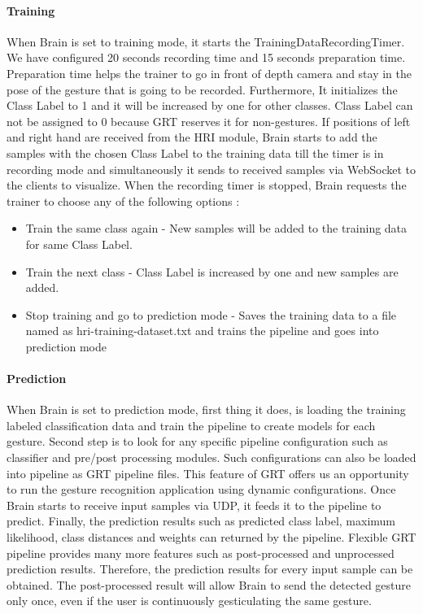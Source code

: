 \paragraph*{Training} When Brain is set to training mode, it starts the TrainingDataRecordingTimer. We have configured 20 seconds recording time and 15 seconds preparation time. Preparation time helps the trainer to go in front of depth camera and stay in the pose of the gesture that is going to be recorded. Furthermore, It initializes the Class Label to 1 and it will be increased by one for other classes. Class Label can not be assigned to 0 because GRT reserves it for non-gestures. If positions of left and right hand are received from the HRI module, Brain starts to add the samples with the chosen Class Label to the training data till the timer is in recording mode and simultaneously it sends to received samples via WebSocket to the clients to visualize. When the recording timer is stopped, Brain requests the trainer to choose any of the following options :

\begin{itemize}
	\item Train the same class again - New samples will be added to the training data for same Class Label.
	\item Train the next class - Class Label is increased by one and new samples are added.
	\item Stop training and go to prediction mode - Saves the training data to a file named as hri-training-dataset.txt and trains the pipeline and goes into prediction mode
\end{itemize}

\paragraph*{Prediction} When Brain is set to prediction mode, first thing it does, is loading the training labeled classification data and train the pipeline to create models for each gesture. Second step is to look for any specific pipeline configuration such as classifier and pre/post processing modules. Such configurations can also be loaded into pipeline as GRT pipeline files. This feature of GRT offers us an opportunity to run the gesture recognition application using dynamic configurations. Once Brain starts to receive input samples via UDP, it feeds it to the pipeline to predict. Finally, the prediction results such as predicted class label, maximum likelihood, class distances and weights can returned by the pipeline. Flexible GRT pipeline provides many more features such as post-processed and unprocessed prediction results. Therefore, the prediction results for every input sample can be obtained. The post-processed result will allow Brain to send the detected gesture only once, even if the user is continuously gesticulating the same gesture.  

